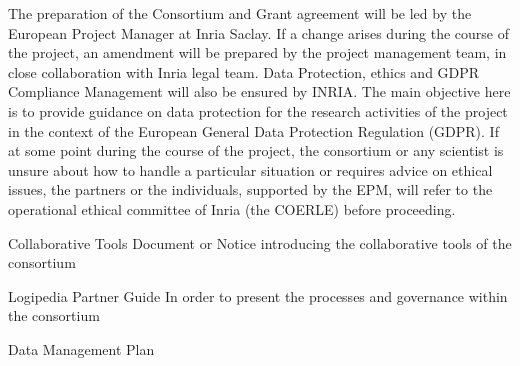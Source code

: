 \begin{workpackage}[id=management,type=MGT,wphases=1-48,
  short=Management,
  title=Management,
  lead=Inr,InrRM=50,BirRM=1,InnRM=1,SacRM=1,TumRM=1,LeeRM=1]
\begin{tasklist}
  \begin{task}[id=legal,title={Legal Management (data, ethics, GDPR)},wphases=1-48]
    The preparation of the Consortium and Grant agreement will be led
    by the European Project Manager at Inria Saclay. If a change
    arises during the course of the project, an amendment will be
    prepared by the project management team, in close collaboration
    with Inria legal team.  Data Protection, ethics and GDPR
    Compliance Management will also be ensured by INRIA. The main
    objective here is to provide guidance on data protection for the
    research activities of the project in the context of the European
    General Data Protection Regulation (GDPR). If at some point during
    the course of the project, the consortium or any scientist is
    unsure about how to handle a particular situation or requires
    advice on ethical issues, the partners or the individuals,
    supported by the EPM, will refer to the operational ethical
    committee of Inria (the COERLE) before proceeding.
  \end{task}

\end{tasklist}

\begin{wpdelivs}
  
  \begin{wpdeliv}[due=2,id=collab-tools,dissem=PU,nature=DEC,lead=Inr]{Collaborative Tools} Document or Notice introducing the collaborative tools of the consortium
  \end{wpdeliv}

  \begin{wpdeliv}[due=3,id=guide,dissem=PU,nature=R,lead=Inr]{Logipedia Partner Guide} In order to present the processes and governance within the consortium
  \end{wpdeliv}

  \begin{wpdeliv}[due=6,id=data-plan,dissem=PU,nature=R,lead=Inr]{Data Management Plan}
  \end{wpdeliv}
  
\end{wpdelivs}

\end{workpackage}


